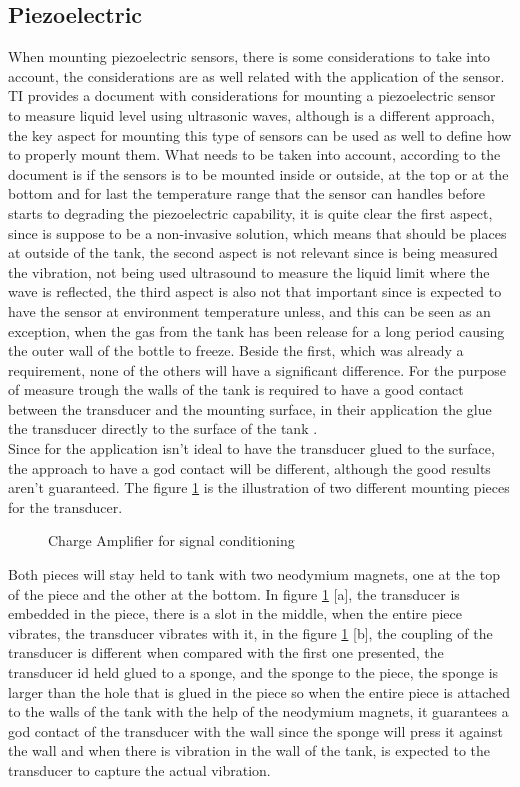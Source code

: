\subsection{Piezoelectric}
When mounting piezoelectric sensors, there is some considerations to take into account, the considerations are as well related with the application of the sensor. TI provides a document with considerations for mounting a piezoelectric sensor to measure liquid level using ultrasonic waves, although is a different approach, the key aspect for mounting this type of sensors can be used as well to define how to properly mount them. What needs to be taken into account, according to the document is if the sensors is to be mounted inside or outside, at the top or at the bottom and for last the temperature range that the sensor can handles before starts to degrading the piezoelectric capability, it is quite clear the first aspect, since is suppose to be a non-invasive solution, which means that should be places at outside of the tank, the second aspect is not relevant since is being measured the vibration, not being used ultrasound to measure the liquid limit where the wave is reflected, the third aspect is also not that important since is expected to have the sensor at environment temperature unless, and this can be seen as an exception, when the gas from the tank has been release for a long period causing the outer wall of the bottle to freeze. Beside the first, which was already a requirement, none of the others will have a significant difference. For the purpose of measure trough the walls of the tank is required to have a good contact between the transducer and the mounting surface, in their application the glue the transducer directly to the surface of the tank \cite{minasiHowSelectMount2015}.\\
Since for the application isn't ideal to have the transducer glued to the surface, the approach to have a god contact will be different, although the good results aren't guaranteed. The figure \ref{fig:coupPiezo} is the illustration of two different mounting pieces for the transducer.
\begin{figure}[!htb]
    \centering
    \caption{Charge Amplifier for signal conditioning}
    \label{fig:coupPiezo}
\end{figure}
Both pieces will stay held to tank with two neodymium magnets, one at the top of the piece and the other at the bottom. In figure \ref{fig:coupPiezo} [a], the transducer is embedded in the piece, there is a slot in the middle, when the entire piece vibrates, the transducer vibrates with it, in the figure \ref{fig:coupPiezo} [b], the coupling of the transducer is different when compared with the first one presented, the transducer id held glued to a sponge, and the sponge to the piece, the sponge is larger than the hole that is glued in the piece so when the entire piece is attached to the walls of the tank with the help of the neodymium magnets, it guarantees a god contact of the transducer with the wall since the sponge will press it against the wall and when there is vibration in the wall of the tank, is expected to the transducer to capture the actual vibration. 
